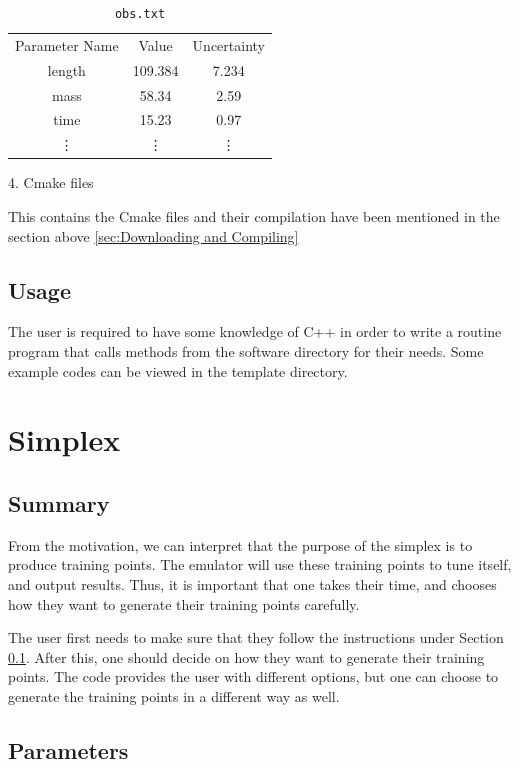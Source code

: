 \documentclass[12pt]{article}
\numberwithin{equation}{section}
\numberwithin{figure}{section}
\begin{document}
\begin{table}[!h]
    \centering
    \begin{tabular}{c|c|c}
         Parameter Name & Value & Uncertainty\\
         length & 109.384 & 7.234\\
         mass & 58.34 & 2.59 \\
         time & 15.23 & 0.97 \\
          \vdots & \vdots & \vdots
    \end{tabular}
    \caption{{\tt{obs.txt}}}
    \label{tab:my_label}
\end{table}

4. Cmake files 

This contains the Cmake files and their compilation have been mentioned in the section above \ref{sec:Downloading and Compiling} 


\subsection{Usage}
\label{sec:Usage}

The user is required to have some knowledge of C++ in order to write a routine program that calls methods from the software directory for their needs. Some example codes can be viewed in the template directory.

\section{Simplex}

\subsection{Summary}
From the motivation, we can interpret that the purpose of the simplex is to produce training points. The emulator will use these training points to tune itself, and output results. Thus, it is important that one takes their time, and chooses how they want to generate their training points carefully.

The user first needs to make sure that they follow the instructions under Section \ref{sec:Usage}. After this, one should decide on how they want to generate their training points. The code provides the user with different options, but one can choose to generate the training points in a different way as well.

\subsection{Parameters}
\end{document}
